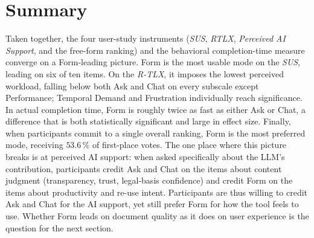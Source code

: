 \section{Summary}
\label{sec:eval-userstudy-summary}

Taken together, the four user-study instruments (\textit{SUS}, \textit{RTLX},
\textit{Perceived AI Support}, and the free-form ranking)
and the behavioral completion-time measure converge on a
Form-leading picture. Form is the most usable mode on the \textit{SUS},
leading on six of ten items. On the \textit{R-TLX}, it imposes the lowest
perceived workload, falling below both Ask and Chat on every
subscale except Performance; Temporal Demand and Frustration
individually reach significance. In actual completion time, Form
is roughly twice as fast as either Ask or Chat, a difference that
is both statistically significant and large in effect size.
Finally, when participants commit to a single overall ranking,
Form is the most preferred mode, receiving $53.6\,\%$ of
first-place votes.
The one place where this picture breaks is at perceived AI support: when
asked specifically about the LLM's contribution, participants
credit Ask and Chat on the items about content judgment
(transparency, trust, legal-basis confidence) and credit Form on
the items about productivity and re-use intent. Participants are
thus willing to credit Ask and Chat for the AI support,
yet still prefer Form for how the tool feels to use.
Whether Form leads on document quality as it does on user
experience is the question for the next section.